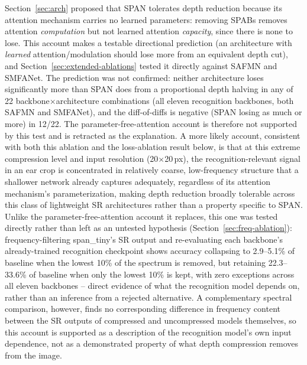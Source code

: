 \documentclass[11pt]{article}
\begin{document}
\label{sec:disc-depth}
Section~\ref{sec:arch} proposed that SPAN tolerates depth reduction because its attention mechanism carries no learned parameters: removing SPABs removes attention \emph{computation} but not learned attention \emph{capacity}, since there is none to lose. This account makes a testable directional prediction (an architecture with \emph{learned} attention/modulation should lose more from an equivalent depth cut), and Section~\ref{sec:extended-ablations} tested it directly against SAFMN and SMFANet. The prediction was not confirmed: neither architecture loses significantly more than SPAN does from a proportional depth halving in any of 22 backbone$\times$architecture combinations (all eleven recognition backbones, both SAFMN and SMFANet), and the diff-of-diffs is negative (SPAN losing as much or more) in 12/22. The parameter-free-attention account is therefore not supported by this test and is retracted as the explanation. A more likely account, consistent with both this ablation and the loss-ablation result below, is that at this extreme compression level and input resolution (20$\times$20\,px), the recognition-relevant signal in an ear crop is concentrated in relatively coarse, low-frequency structure that a shallower network already captures adequately, regardless of its attention mechanism's parameterization, making depth reduction broadly tolerable across this class of lightweight SR architectures rather than a property specific to SPAN. Unlike the parameter-free-attention account it replaces, this one was tested directly rather than left as an untested hypothesis (Section~\ref{sec:freq-ablation}): frequency-filtering span\_tiny's SR output and re-evaluating each backbone's already-trained recognition checkpoint shows accuracy collapsing to 2.9--5.1\% of baseline when the lowest 10\% of the spectrum is removed, but retaining 22.3--33.6\% of baseline when only the lowest 10\% is kept, with zero exceptions across all eleven backbones -- direct evidence of what the recognition model depends on, rather than an inference from a rejected alternative. A complementary spectral comparison, however, finds no corresponding difference in frequency content between the SR outputs of compressed and uncompressed models themselves, so this account is supported as a description of the recognition model's own input dependence, not as a demonstrated property of what depth compression removes from the image.
\end{document}
